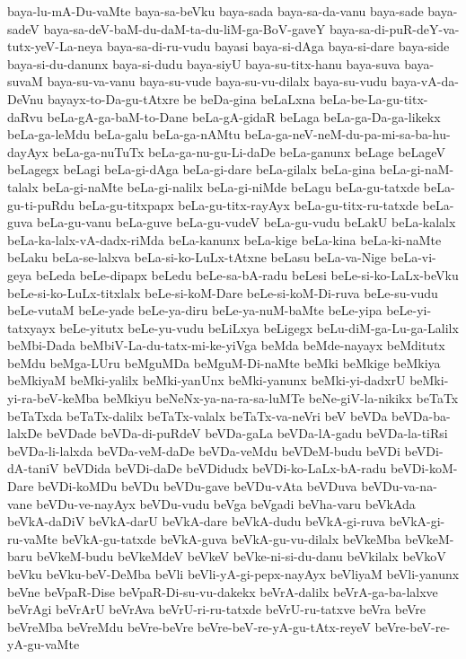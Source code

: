 {baya-lu-mA-Du-vaMte
baya-sa-beVku
baya-sada
baya-sa-da-vanu
baya-sade
baya-sadeV
baya-sa-deV-baM-du-daM-ta-du-liM-ga-BoV-gaveY
baya-sa-di-puR-deY-va-tutx-yeV-La-neya
baya-sa-di-ru-vudu
bayasi
baya-si-dAga
baya-si-dare
baya-side
baya-si-du-danunx
baya-si-dudu
baya-siyU
baya-su-titx-hanu
baya-suva
baya-suvaM
baya-su-va-vanu
baya-su-vude
baya-su-vu-dilalx
baya-su-vudu
baya-vA-da-DeVnu
bayayx-to-Da-gu-tAtxre
be
beDa-gina
beLaLxna
beLa-be-La-gu-titx-daRvu
beLa-gA-ga-baM-to-Dane
beLa-gA-gidaR
beLaga
beLa-ga-Da-ga-likekx
beLa-ga-leMdu
beLa-galu
beLa-ga-nAMtu
beLa-ga-neV-neM-du-pa-mi-sa-ba-hu-dayAyx
beLa-ga-nuTuTx
beLa-ga-nu-gu-Li-daDe
beLa-ganunx
beLage
beLageV
beLagegx
beLagi
beLa-gi-dAga
beLa-gi-dare
beLa-gilalx
beLa-gina
beLa-gi-naM-talalx
beLa-gi-naMte
beLa-gi-nalilx
beLa-gi-niMde
beLagu
beLa-gu-tatxde
beLa-gu-ti-puRdu
beLa-gu-titxpapx
beLa-gu-titx-rayAyx
beLa-gu-titx-ru-tatxde
beLa-guva
beLa-gu-vanu
beLa-guve
beLa-gu-vudeV
beLa-gu-vudu
beLakU
beLa-kalalx
beLa-ka-lalx-vA-dadx-riMda
beLa-kanunx
beLa-kige
beLa-kina
beLa-ki-naMte
beLaku
beLa-se-lalxva
beLa-si-ko-LuLx-tAtxne
beLasu
beLa-va-Nige
beLa-vi-geya
beLeda
beLe-dipapx
beLedu
beLe-sa-bA-radu
beLesi
beLe-si-ko-LaLx-beVku
beLe-si-ko-LuLx-titxlalx
beLe-si-koM-Dare
beLe-si-koM-Di-ruva
beLe-su-vudu
beLe-vutaM
beLe-yade
beLe-ya-diru
beLe-ya-nuM-baMte
beLe-yipa
beLe-yi-tatxyayx
beLe-yitutx
beLe-yu-vudu
beLiLxya
beLigegx
beLu-diM-ga-Lu-ga-Lalilx
beMbi-Dada
beMbiV-La-du-tatx-mi-ke-yiVga
beMda
beMde-nayayx
beMditutx
beMdu
beMga-LUru
beMguMDa
beMguM-Di-naMte
beMki
beMkige
beMkiya
beMkiyaM
beMki-yalilx
beMki-yanUnx
beMki-yanunx
beMki-yi-dadxrU
beMki-yi-ra-beV-keMba
beMkiyu
beNeNx-ya-na-ra-sa-luMTe
beNe-giV-la-nikikx
beTaTx
beTaTxda
beTaTx-dalilx
beTaTx-valalx
beTaTx-va-neVri
beV
beVDa
beVDa-ba-lalxDe
beVDade
beVDa-di-puRdeV
beVDa-gaLa
beVDa-lA-gadu
beVDa-la-tiRsi
beVDa-li-lalxda
beVDa-veM-daDe
beVDa-veMdu
beVDeM-budu
beVDi
beVDi-dA-taniV
beVDida
beVDi-daDe
beVDidudx
beVDi-ko-LaLx-bA-radu
beVDi-koM-Dare
beVDi-koMDu
beVDu
beVDu-gave
beVDu-vAta
beVDuva
beVDu-va-na-vane
beVDu-ve-nayAyx
beVDu-vudu
beVga
beVgadi
beVha-varu
beVkAda
beVkA-daDiV
beVkA-darU
beVkA-dare
beVkA-dudu
beVkA-gi-ruva
beVkA-gi-ru-vaMte
beVkA-gu-tatxde
beVkA-guva
beVkA-gu-vu-dilalx
beVkeMba
beVkeM-baru
beVkeM-budu
beVkeMdeV
beVkeV
beVke-ni-si-du-danu
beVkilalx
beVkoV
beVku
beVku-beV-DeMba
beVli
beVli-yA-gi-pepx-nayAyx
beVliyaM
beVli-yanunx
beVne
beVpaR-Dise
beVpaR-Di-su-vu-dakekx
beVrA-dalilx
beVrA-ga-ba-lalxve
beVrAgi
beVrArU
beVrAva
beVrU-ri-ru-tatxde
beVrU-ru-tatxve
beVra
beVre
beVreMba
beVreMdu
beVre-beVre
beVre-beV-re-yA-gu-tAtx-reyeV
beVre-beV-re-yA-gu-vaMte
}

